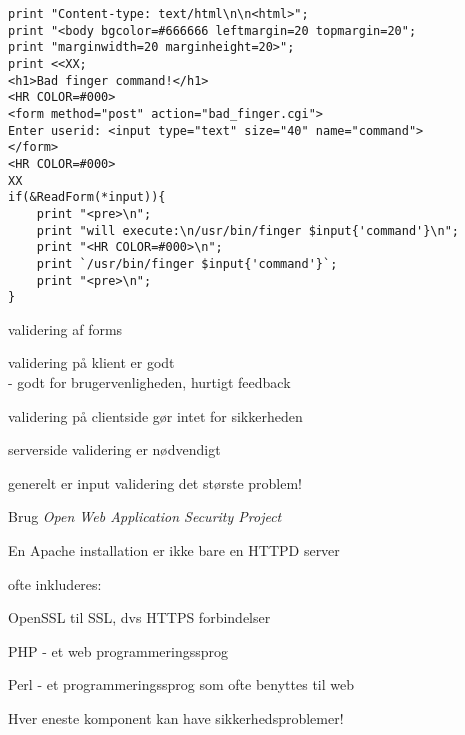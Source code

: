
{\small
\begin{verbatim}
print "Content-type: text/html\n\n<html>";
print "<body bgcolor=#666666 leftmargin=20 topmargin=20"; 
print "marginwidth=20 marginheight=20>";
print <<XX;
<h1>Bad finger command!</h1>
<HR COLOR=#000>
<form method="post" action="bad_finger.cgi">
Enter userid: <input type="text" size="40" name="command">
</form>
<HR COLOR=#000>
XX
if(&ReadForm(*input)){
    print "<pre>\n";
    print "will execute:\n/usr/bin/finger $input{'command'}\n";
    print "<HR COLOR=#000>\n";
    print `/usr/bin/finger $input{'command'}`;
    print "<pre>\n";
}
\end{verbatim}}


\begin{list1}
\item validering af forms
\item validering på klient er godt\\
- godt for brugervenligheden, hurtigt feedback
\item validering på clientside gør intet for sikkerheden
\item serverside validering er nødvendigt
\item generelt er input validering det største problem!
\end{list1}

Brug \emph{Open Web Application Security
Project} 


\begin{list1}
\item En Apache installation er ikke bare en HTTPD server
\item ofte inkluderes:
  \begin{list2}
  \item OpenSSL til SSL, dvs HTTPS forbindelser
  \item PHP - et web programmeringssprog
  \item Perl - et programmeringssprog som ofte benyttes til web
  \end{list2}
\item Hver eneste komponent kan have sikkerhedsproblemer!
\end{list1}




